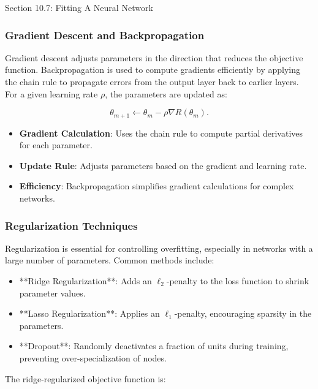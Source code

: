 \begin{notes}{Section 10.7: Fitting A Neural Network}
    \subsubsection*{Gradient Descent and Backpropagation}
    
    Gradient descent adjusts parameters in the direction that reduces the objective function. Backpropagation is used to compute gradients efficiently by applying the chain rule to propagate errors from the 
    output layer back to earlier layers. For a given learning rate $\rho$, the parameters are updated as:
    
    \[
    \theta_{m+1} \leftarrow \theta_m - \rho \nabla R(\theta_m).
    \]
    
    \begin{highlight}
        \begin{itemize}
            \item \textbf{Gradient Calculation}: Uses the chain rule to compute partial derivatives for each parameter.
            \item \textbf{Update Rule}: Adjusts parameters based on the gradient and learning rate.
            \item \textbf{Efficiency}: Backpropagation simplifies gradient calculations for complex networks.
        \end{itemize}
    \end{highlight}
    
    \subsubsection*{Regularization Techniques}
    
    Regularization is essential for controlling overfitting, especially in networks with a large number of parameters. Common methods include:
    
    \begin{itemize}
        \item **Ridge Regularization**: Adds an $\ell_2$-penalty to the loss function to shrink parameter values.
        \item **Lasso Regularization**: Applies an $\ell_1$-penalty, encouraging sparsity in the parameters.
        \item **Dropout**: Randomly deactivates a fraction of units during training, preventing over-specialization of nodes.
    \end{itemize}
    
    The ridge-regularized objective function is:
    

\end{notes}
